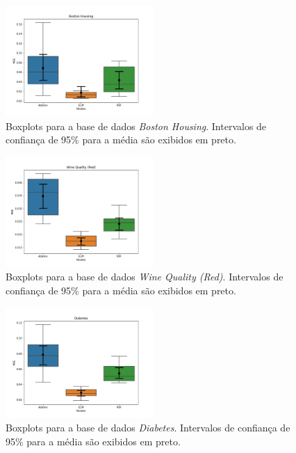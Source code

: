 \documentclass[conference]{IEEEtran}
\begin{document}
	\begin{figure}[thpbh]
		\centering
		\includegraphics[width=0.5\textwidth]{figures/Boston Housing_scores.png}
		\caption{Boxplots para a base de dados \textit{Boston Housing}. Intervalos de confiança de 95\% para a média são exibidos em preto.}
		\label{fig:box-Boston-Housing}
	\end{figure}
	
	\begin{figure}[thpbh]
		\centering
		\includegraphics[width=0.5\textwidth]{figures/Wine Quality (Red)_scores.png}
		\caption{Boxplots para a base de dados \textit{Wine Quality (Red)}. Intervalos de confiança de 95\% para a média são exibidos em preto.}
		\label{fig:box-Wine}
	\end{figure}
	
	\begin{figure}[thpbh]
		\centering
		\includegraphics[width=0.5\textwidth]{figures/Diabetes_scores.png}
		\caption{Boxplots para a base de dados \textit{Diabetes}. Intervalos de confiança de 95\% para a média são exibidos em preto.}
		\label{fig:box-Diabetes}
	\end{figure}
\end{document}

